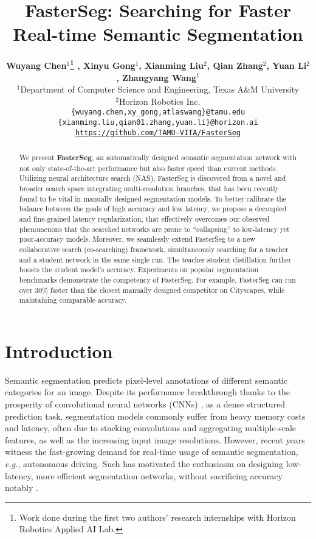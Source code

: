 \documentclass{article} \usepackage{iclr2020_conference,times}
\title{FasterSeg: Searching for Faster Real-time Semantic Segmentation}
\author{\textbf{Wuyang Chen$^1$\thanks{Work done during the first two authors' research internships with Horizon Robotics Applied AI Lab.} , Xinyu Gong$^1$\samethanks , Xianming Liu$^2$, Qian Zhang$^2$, Yuan Li$^2$, Zhangyang Wang$^1$}\\ \vspace{-0.8em}
$^1$Department of Computer Science and Engineering, Texas A\&M University\\
$^2$Horizon Robotics Inc.\\
\texttt{{\small \{wuyang.chen,xy\_gong,atlaswang\}@tamu.edu}} \\
\texttt{{\small \{xianming.liu,qian01.zhang,yuan.li\}@horizon.ai}}\\
\texttt{{\small \url{https://github.com/TAMU-VITA/FasterSeg}}}
}
\begin{document}
\maketitle




\begin{abstract}
We present \textbf{FasterSeg}, an automatically designed semantic segmentation network with not only state-of-the-art performance but also faster speed than current methods. Utilizing neural architecture search (NAS), FasterSeg is discovered from a novel and broader search space
integrating
multi-resolution branches, that has been recently found to be vital in manually designed segmentation models. 
To better calibrate the balance between the goals of high accuracy and low latency, we propose a decoupled and fine-grained latency regularization, that effectively overcomes our observed phenomenons that the searched networks are prone to ``collapsing'' to low-latency yet poor-accuracy models. 
Moreover, we seamlessly extend FasterSeg to a new collaborative search (co-searching) framework, simultaneously searching for a teacher and a student network in the same single run. The teacher-student distillation further boosts the student model's accuracy. Experiments on popular segmentation benchmarks demonstrate the competency
of FasterSeg. For example, FasterSeg can run over 30\% faster than the closest manually designed competitor on Cityscapes, while maintaining comparable accuracy.
\end{abstract}\vspace{-0.5em}

\section{Introduction}\vspace{-0.3em}

Semantic segmentation predicts pixel-level annotations of different semantic categories for an image. Despite its performance breakthrough thanks to the prosperity of convolutional neural networks (CNNs) \citep{long2015fully}, as a dense structured prediction task, segmentation models commonly suffer from heavy memory costs and latency, often due to stacking convolutions and aggregating multiple-scale features, as well as the increasing input image resolutions. However, recent years witness the fast-growing demand for real-time usage of semantic segmentation, \textit{e.g.}, autonomous driving. Such has motivated the enthusiasm on designing low-latency, more efficient segmentation networks, without sacrificing accuracy notably \citep{zhao2018icnet,yu2018bisenet}.
\end{document}
